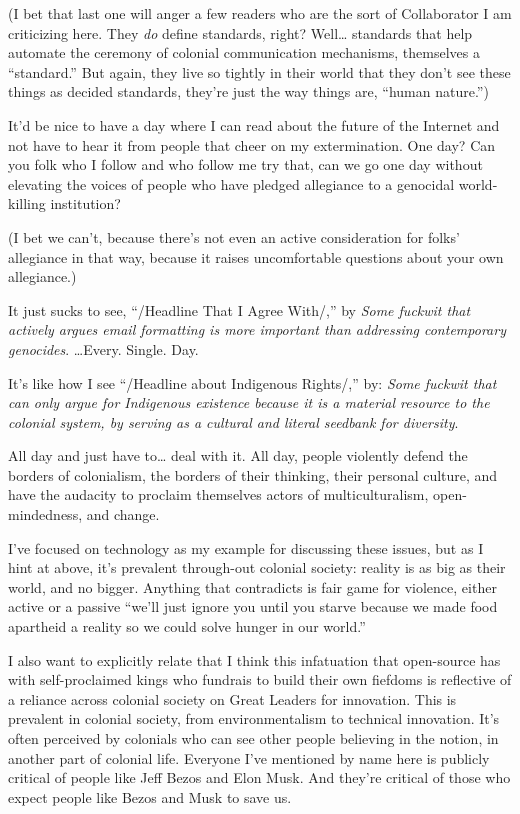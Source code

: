 \documentclass[11pt]{article}
\begin{document}
\begin{itemize}
(I bet that last one will anger a few readers who are the sort of Collaborator I am criticizing here. They \emph{do} define standards, right? Well… standards that help automate the ceremony of colonial communication mechanisms, themselves a “standard.” But again, they live so tightly in their world that they don’t see these things as decided standards, they’re just the way things are, “human nature.”)

It’d be nice to have a day where I can read about the future of the Internet and not have to hear it from people that cheer on my extermination. One day? Can you folk who I follow and who follow me try that, can we go one day without elevating the voices of people who have pledged allegiance to a genocidal world-killing institution?

(I bet we can’t, because there’s not even an active consideration for folks’ allegiance in that way, because it raises uncomfortable questions about your own allegiance.)

It just sucks to see, “/Headline That I Agree With/,” by \emph{Some fuckwit that actively argues email formatting is more important than addressing contemporary genocides}. …Every. Single. Day.

It’s like how I see “/Headline about Indigenous Rights/,” by: \emph{Some fuckwit that can only argue for Indigenous existence because it is a material resource to the colonial system, by serving as a cultural and literal seedbank for diversity}.

All day and just have to… deal with it. All day, people violently defend the borders of colonialism, the borders of their thinking, their personal culture, and have the audacity to proclaim themselves actors of multiculturalism, open-mindedness, and change.

I’ve focused on technology as my example for discussing these issues, but as I hint at above, it’s prevalent through-out colonial society: reality is as big as their world, and no bigger. Anything that contradicts is fair game for violence, either active or a passive “we’ll just ignore you until you starve because we made food apartheid a reality so we could solve hunger in our world.”

I also want to explicitly relate that I think this infatuation that open-source has with self-proclaimed kings who fundrais to build their own fiefdoms is reflective of a reliance across colonial society on Great Leaders for innovation. This is prevalent in colonial society, from environmentalism to technical innovation. It’s often perceived by colonials who can see other people believing in the notion, in another part of colonial life. Everyone I’ve mentioned by name here is publicly critical of people like Jeff Bezos and Elon Musk. And they’re critical of those who expect people like Bezos and Musk to save us.


\end{itemize}
\end{document}
